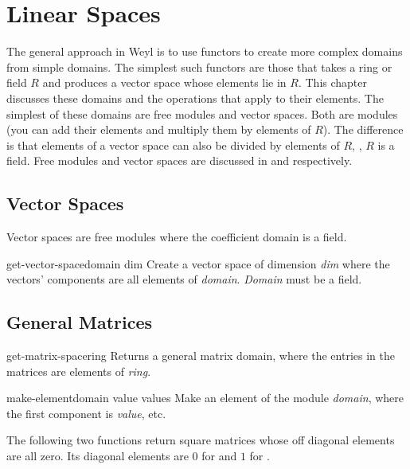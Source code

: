 \chapter{Linear Spaces}
\label{Linear:Chap}

The general approach in Weyl is to use functors to create more complex
domains from simple domains. The simplest such functors are those that
takes a ring or field $R$ and produces a vector space whose elements
lie in $R$. This chapter discusses these domains and the operations
that apply to their elements. The simplest of these domains are free
modules and vector spaces. Both are modules (you can add their
elements and multiply them by elements of $R$). The difference is that
elements of a vector space can also be divided by elements of $R$,
\ie, $R$ is a field. Free modules and vector spaces are discussed in
 and  respectively.

\section{Vector Spaces}
\label{VectorSpace:Sec}

Vector spaces are free modules where the coefficient domain is a field.

\begin{functiondef}{get-vector-space}{domain dim}
Create a vector space of dimension {\em dim} where the vectors'
components are all elements of {\em domain}.  {\em Domain} must be a
field.
\end{functiondef}


\section{General Matrices}
\label{GMatrix:Sec}

\begin{functiondef}{get-matrix-space}{ring}
Returns a general matrix domain, where the entries in the matrices are
elements of {\em ring\/}.
\end{functiondef}

\begin{functiondef}{make-element}{domain value \rest values}
Make an element of the module {\em domain}, where the first component
is {\em value}, etc.  
\end{functiondef}

The following two functions return square matrices whose off diagonal
elements are all zero. Its diagonal elements are $0$ for
 and $1$ for .

